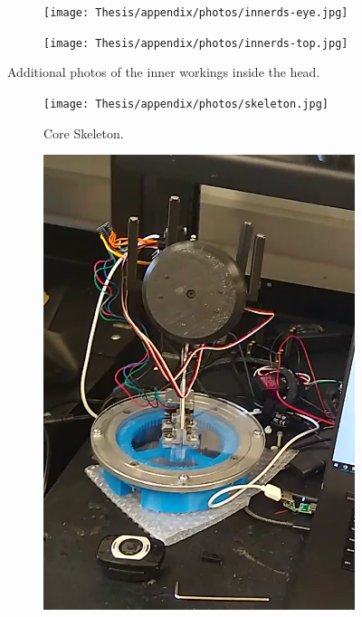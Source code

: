 \begin{figure}[h]
    \centering
    \begin{subfigure}{0.49\linewidth}
        \centering
        \texttt{[image: Thesis/appendix/photos/innerds-eye.jpg]}
        \caption{}
    \end{subfigure}\hfill
    \begin{subfigure}{0.49\linewidth}
        \centering
        \texttt{[image: Thesis/appendix/photos/innerds-top.jpg]}
        \caption{}
    \end{subfigure}
    \caption{Additional photos of the inner workings inside the head.}
    \label{fig:inner-workings}
\end{figure}

\begin{figure}[h]
    \centering
    \begin{subfigure}{0.35\linewidth}
        \centering
        \texttt{[image: Thesis/appendix/photos/skeleton.jpg]}
        \caption{Core Skeleton.}
    \end{subfigure}
    \begin{subfigure}[b]{0.25\linewidth}
        \centering
        \includegraphics[width=\textwidth]{Thesis/appendix/photos/bare-robot.png}

\end{subfigure}
\end{figure}
